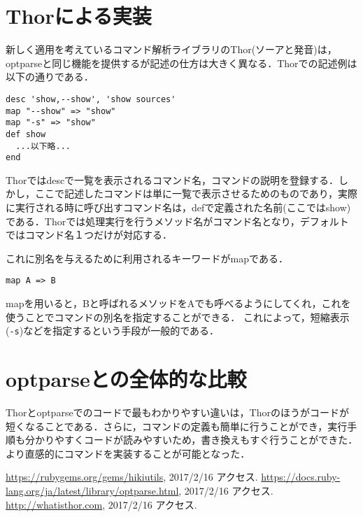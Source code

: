 \documentclass[a4j,twocolumn]{jsarticle}
\begin{document}
\section{Thorによる実装}
\vspace{-0.5em}
新しく適用を考えているコマンド解析ライブラリのThor(ソーアと発音)は，optparseと同じ機能を提供するが記述の仕方は大きく異なる．Thorでの記述例は以下の通りである．
\begin{lstlisting}[style=customRuby,basicstyle={\scriptsize\ttfamily}]
desc 'show,--show', 'show sources'
map "--show" => "show"
map "-s" => "show"
def show
  ...以下略...
end
\end{lstlisting}
Thorではdescで一覧を表示されるコマンド名，コマンドの説明を登録する．しかし，ここで記述したコマンドは単に一覧で表示させるためのものであり，実際に実行される時に呼び出すコマンド名は，defで定義された名前(ここではshow)である．Thorでは処理実行を行うメソッド名がコマンド名となり，デフォルトではコマンド名１つだけが対応する．

これに別名を与えるために利用されるキーワードがmapである．
\begin{verbatim}
map A => B
\end{verbatim}
mapを用いると，Bと呼ばれるメソッドをAでも呼べるようにしてくれ，これを使うことでコマンドの別名を指定することができる．
これによって，短縮表示(\verb|-s|)などを指定するという手段が一般的である．

\section{optparseとの全体的な比較}
\vspace{-0.5em}
Thorとoptparseでのコードで最もわかりやすい違いは，Thorのほうがコードが短くなることである．さらに，コマンドの定義も簡単に行うことができ，実行手順も分かりやすくコードが読みやすいため，書き換えもすぐ行うことができた．より直感的にコマンドを実装することが可能となった．

\begin{thebibliography}{9}
 \url{https://rubygems.org/gems/hikiutils}, 2017/2/16 アクセス.
 \url{https://docs.ruby-lang.org/ja/latest/library/optparse.html}, 2017/2/16 アクセス.
\url{http://whatisthor.com}, 2017/2/16 アクセス.
\end{thebibliography}
\end{document}
